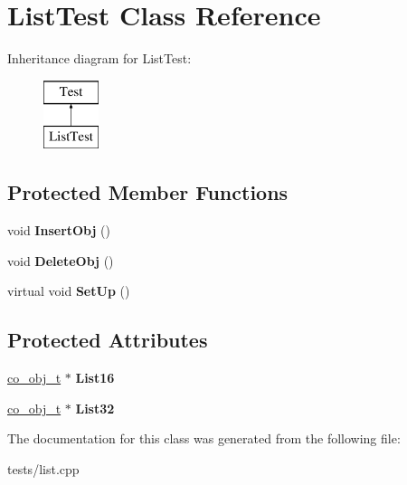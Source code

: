 \hypertarget{classListTest}{\section{List\-Test Class Reference}
\label{classListTest}
}
Inheritance diagram for List\-Test\-:\begin{figure}[H]
\begin{center}
\leavevmode
\includegraphics[height=2.000000cm]{classListTest}
\end{center}
\end{figure}
\subsection*{Protected Member Functions}
\begin{DoxyCompactItemize}
\item 
\hypertarget{classListTest_affc2f4cf21beae819fb58f55bb8a27a6}{void {\bfseries Insert\-Obj} ()}\label{classListTest_affc2f4cf21beae819fb58f55bb8a27a6}

\item 
\hypertarget{classListTest_a3f003521f77f0d69ce15c250c9b3110c}{void {\bfseries Delete\-Obj} ()}\label{classListTest_a3f003521f77f0d69ce15c250c9b3110c}

\item 
\hypertarget{classListTest_a6ce63aead1163d5e2921ade6a1416912}{virtual void {\bfseries Set\-Up} ()}\label{classListTest_a6ce63aead1163d5e2921ade6a1416912}

\end{DoxyCompactItemize}
\subsection*{Protected Attributes}
\begin{DoxyCompactItemize}
\item 
\hypertarget{classListTest_ae7f2c29aec56333f92c277820f1e1bee}{\hyperlink{structco__obj__t}{co\-\_\-obj\-\_\-t} $\ast$ {\bfseries List16}}\label{classListTest_ae7f2c29aec56333f92c277820f1e1bee}

\item 
\hypertarget{classListTest_a3710a8726b3583f7dc600cb1377331a8}{\hyperlink{structco__obj__t}{co\-\_\-obj\-\_\-t} $\ast$ {\bfseries List32}}\label{classListTest_a3710a8726b3583f7dc600cb1377331a8}

\end{DoxyCompactItemize}


The documentation for this class was generated from the following file\-:\begin{DoxyCompactItemize}
\item 
tests/list.\-cpp\end{DoxyCompactItemize}

